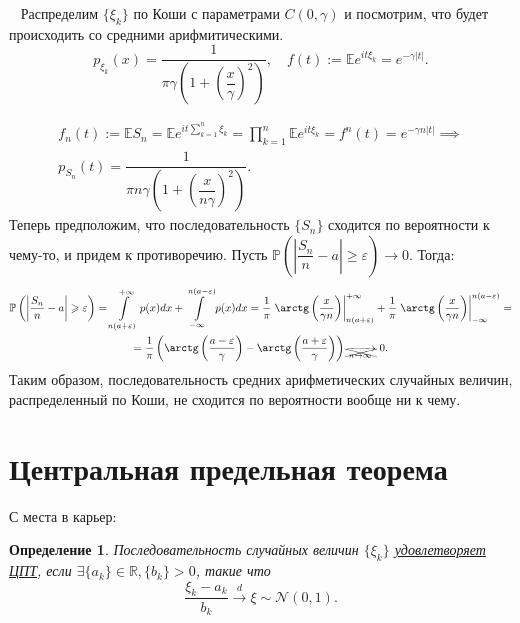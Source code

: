 \documentclass[12pt]{article}
\newtheorem{Def}{Определение}
\newenvironment{Ex}{{\bf Пример}\ }{}
\numberwithin{Th}{section}
\numberwithin{Def}{section}
\numberwithin{Lem}{section}
\numberwithin{St}{section}
\numberwithin{equation}{section}
\newcommand\Pro{\mathbb{P}} %
\newcommand\Real{\mathbb{R}} %
\newcommand\Expec{\mathbb{E}} %
\newcommand\Norm{\mathcal{N}} %
\begin{document}
\begin{Ex}
    Распределим $\{ \xi_k \}$ по Коши с параметрами $C(0, \gamma)$ и посмотрим, что будет происходить со средними арифмитическими.
    \[
        p_{\xi_k} (x) = \dfrac{1}{\pi \gamma \left( 1 + \left( \dfrac{x}{\gamma} \right) ^2 \right) }, \quad
        f(t) :=  \Expec e^{it\xi_k} = e^{-\gamma \left| t \right| }
    .\]

    \begin{multline*}
        f_n(t) := \Expec S_n = 
        \Expec e^{it \sum\limits_{k=1}^{n} \xi_k} = 
        \prod\limits_{k=1}^{n} \Expec e^{it\xi_k} = 
        f^{n} \left( t \right) =
        e^{-\gamma n \left| t \right| } \implies \\
        p_{S_n} \left( t \right) = \dfrac{1}{\pi n \gamma \left( 1 + \left( \dfrac{x}{n \gamma} \right)^2 \right) }
    .\end{multline*}
    Теперь предположим, что последовательность $\{ S_n \} $ сходится по вероятности к чему-то, и придем к противоречию.
    Пусть $\Pro \left( \left| \dfrac{S_n}{n} - a \right| \geqslant \varepsilon \right) \rightarrow 0$. Тогда:
    \begin{multline*}
        \Pro \left( \left| \dfrac{S_n}{n} - a \right| \geqslant \varepsilon \right) = \int\limits_{n(a+\varepsilon)}^{+\infty} p(x)dx + \int\limits_{-\infty}^{n(a - \varepsilon)} p(x)dx = 
        \dfrac{1}{\pi} \left. \arctg \left( \dfrac{x}{\gamma n} \right) \right|_{n(a+\varepsilon)}^{+\infty} + 
        \dfrac{1}{\pi} \left. \arctg \left( \dfrac{x}{\gamma n} \right) \right|_{-\infty}^{n(a - \varepsilon)} = \\
        = \dfrac{1}{\pi} \left( \arctg \left( \dfrac{a - \varepsilon}{\gamma} \right) - \arctg \left( \dfrac{a + \varepsilon}{\gamma} \right)  \right) 
        \xcancel{ \xrightarrow[n \rightarrow \infty]{}} \ 0
    .\end{multline*}
    Таким образом, последовательность средних арифметических случайных величин, распределенный по Коши, не сходится по вероятности вообще ни к чему.
\end{Ex} 

\newpage
\section{Центральная предельная теорема}

С места в карьер:

\begin{Def}
    Последовательность случайных величин $\{ \xi_k \}$ \uline{удовлетворяет ЦПТ}, если $\exists \{ a_k \} \in \Real, \{ b_k \} > 0$, такие что 
    \[
        \dfrac{\xi_k - a_k}{b_k} \xrightarrow[]{d} \xi \sim \Norm(0, 1)
    .\] 
\end{Def}
\end{document}
